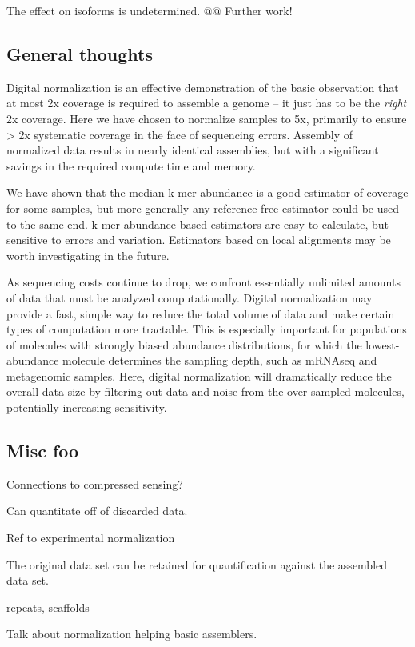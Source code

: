 \documentclass[10pt,draft]{article}
\begin{document}
The effect on isoforms is undetermined.  @@  Further work!

\subsection{General thoughts}

Digital normalization is an effective demonstration of the basic
observation that at most 2x coverage is required to assemble a genome
-- it just has to be the {\em right} 2x coverage.  Here we have chosen
to normalize samples to 5x, primarily to ensure > 2x systematic
coverage in the face of sequencing errors.  Assembly of normalized
data results in nearly identical assemblies, but with a significant
savings in the required compute time and memory.

We have shown that the median k-mer abundance is a good estimator of
coverage for some samples, but more generally any reference-free
estimator could be used to the same end.  k-mer-abundance based
estimators are easy to calculate, but sensitive to errors and
variation.  Estimators based on local alignments may be worth
investigating in the future.

As sequencing costs continue to drop, we confront essentially
unlimited amounts of data that must be analyzed computationally.
Digital normalization may provide a fast, simple way to reduce the
total volume of data and make certain types of computation more
tractable.  This is especially important for populations of molecules
with strongly biased abundance distributions, for which the
lowest-abundance molecule determines the sampling depth, such as
mRNAseq and metagenomic samples.  Here, digital normalization will
dramatically reduce the overall data size by filtering out data and
noise from the over-sampled molecules, potentially increasing
sensitivity.

\subsection{Misc foo}

Connections to compressed sensing?

Can quantitate off of discarded data.

Ref to experimental normalization

The original data set can be retained for quantification against the
assembled data set.

repeats, scaffolds

Talk about normalization helping basic assemblers.
\end{document}
